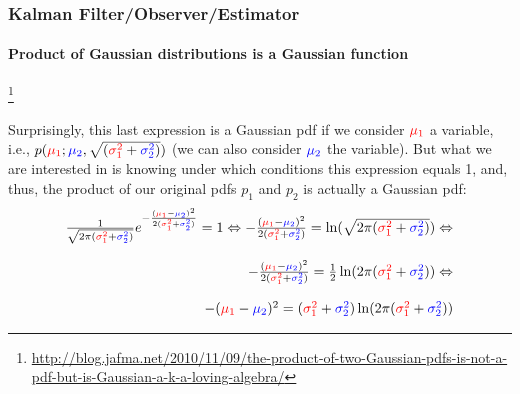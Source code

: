\begin{frame}[plain]
\frametitle{Kalman Filter/Observer/Estimator}
\framesubtitle{Product of Gaussian distributions is a Gaussian function}

\footnote{\tiny\hspace{-0.23in} \hspace{-0.25in}
\href{http://blog.jafma.net/2010/11/09/the-product-of-two-Gaussian-pdfs-is-not-a-pdf-but-is-Gaussian-a-k-a-loving-algebra/}{http://blog.jafma.net/2010/11/09/the-product-of-two-Gaussian-pdfs-is-not-a-pdf-but-is-Gaussian-a-k-a-loving-algebra/}}
\begin{changemargin}{-1.35in}{0in}
\scriptsize
Surprisingly, this last expression is a Gaussian pdf if we consider ${\color{red}\mu_1}$ a variable, i.e., $p({\color{red}\mu_1}; {\color{blue}\mu_2}, \sqrt{({\color{red}\sigma^2_1}+{\color{blue}\sigma^2_2})})$ (we can also consider ${\color{blue}\mu_2}$ the variable). But what we are interested in is knowing under which conditions this expression equals 1, and, thus, the product of our original pdfs $p_1$ and $p_2$ is actually a Gaussian pdf:
\begin{equation*}
\begin{array}{rlllllll}
\frac {1}{ \sqrt{2 \pi ({\color{red}\sigma^2_1} + {\color{blue}\sigma^2_2})} }   e^{- \frac { ({{\color{red}\mu_1}} - {{\color{blue}\mu_2}} )^2 }{ 2({\color{red}\sigma^2_1} + {\color{blue}\sigma^2_2}) } } = 1  \Leftrightarrow    - \frac { ({{\color{red}\mu_1}} - {{\color{blue}\mu_2}} )^2 }{ 2({\color{red}\sigma^2_1} + {\color{blue}\sigma^2_2}) }   = \ln ( \sqrt{2 \pi ({\color{red}\sigma^2_1} + {\color{blue}\sigma^2_2})} )  \Leftrightarrow\\\\
- \frac { ({{\color{red}\mu_1}} - {{\color{blue}\mu_2}} )^2 }{ 2({\color{red}\sigma^2_1} + {\color{blue}\sigma^2_2}) }   = \frac {1}{2} \ln ( 2 \pi ({\color{red}\sigma^2_1} + {\color{blue}\sigma^2_2}) )  \Leftrightarrow\\\\
-  ({{\color{red}\mu_1}} - {{\color{blue}\mu_2}} )^2    = ({\color{red}\sigma^2_1} + {\color{blue}\sigma^2_2}) \ln ( 2 \pi ({\color{red}\sigma^2_1} + {\color{blue}\sigma^2_2}) ) 
\end{array}
\end{equation*}
\end{changemargin}
\end{frame}




